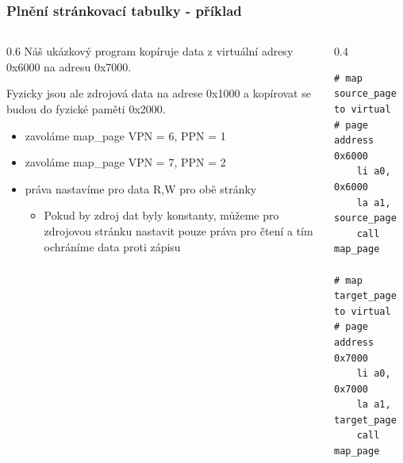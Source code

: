 \documentclass[aspectratio=169]{beamer}
\begin{document}
\begin{frame}[fragile]
\frametitle{Plnění stránkovací tabulky - příklad}

\begin{columns}[t]
\begin{column}{0.6\textwidth}
Náš ukázkový program kopíruje data z virtuální adresy 0x6000 na adresu 0x7000.

Fyzicky jsou ale zdrojová data na adrese 0x1000 a kopírovat se budou do fyzické paměti 0x2000.
\begin{itemize}
\item zavoláme map\_page VPN = 6, PPN = 1
\item zavoláme map\_page VPN = 7, PPN = 2
\item práva nastavíme pro data R,W pro obě stránky
\begin{itemize}
\item Pokud by zdroj dat byly konstanty, můžeme pro zdrojovou stránku nastavit pouze práva pro čtení a tím ochráníme data proti zápisu
\end{itemize}
\end{itemize}
\end{column}
\hfill
\begin{column}{0.4\textwidth}
\begin{verbatim}
# map source_page to virtual
# page address 0x6000
    li a0, 0x6000
    la a1, source_page
    call map_page

# map target_page to virtual
# page address 0x7000
    li a0, 0x7000
    la a1, target_page
    call map_page
\end{verbatim}
\end{column}
\end{columns}
\end{frame}
\end{document}
